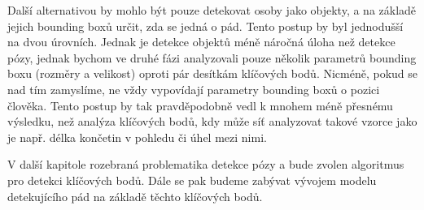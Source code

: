 Další alternativou by mohlo být pouze detekovat osoby jako objekty, a na základě
jejich bounding boxů určit, zda se jedná o pád. Tento postup by byl jednodušší
na dvou úrovních. Jednak je detekce objektů méně náročná úloha než detekce
pózy, jednak bychom ve druhé fázi analyzovali pouze několik parametrů bounding
boxu (rozměry a velikost) oproti pár desítkám klíčových bodů. Nicméně, pokud se
nad tím zamyslíme, ne vždy vypovídají parametry bounding boxů o pozici člověka.
Tento postup by tak pravděpodobně vedl k mnohem méně přesnému výsledku, než
analýza klíčových bodů, kdy může síť analyzovat takové vzorce jako je např.
délka končetin v pohledu či úhel mezi nimi. 

V další kapitole rozebraná problematika detekce pózy a bude zvolen algoritmus
pro detekci klíčových bodů. Dále se pak budeme zabývat vývojem modelu
detekujícího pád na základě těchto klíčových bodů.

